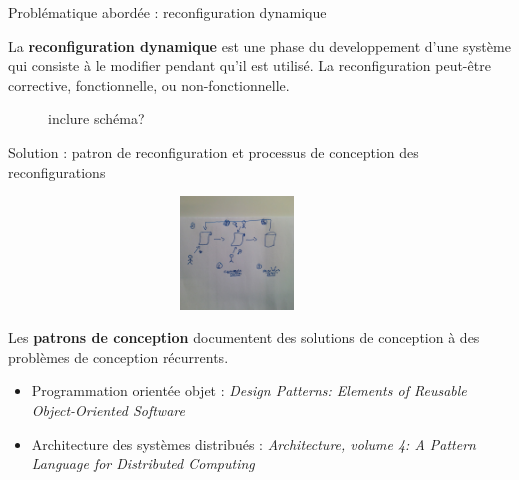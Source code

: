 

\begin{frame}{Problématique abordée : reconfiguration dynamique}
\begin{definition}
La \textbf{reconfiguration dynamique} est une phase du
developpement d'une système qui consiste à le modifier pendant qu’il est
utilisé. La reconfiguration peut-être corrective, fonctionnelle,  ou
non-fonctionnelle.
\end{definition}
\begin{figure}
inclure schéma? 
\end{figure}
\end{frame}

\begin{frame}{Solution : patron de reconfiguration et processus de
conception des reconfigurations}
\begin{figure}
\includegraphics[width=10cm, height=3cm]{imgs/slide_application_patron}
\end{figure}
\begin{definition}
Les \textbf{patrons de conception} documentent des solutions de
conception à des problèmes de conception récurrents.
\end{definition}
\begin{exampleblock}{}
\begin{itemize}
\item Programmation orientée objet : \textit{Design Patterns: Elements of
Reusable Object-Oriented Software} 
\item Architecture des systèmes distribués : \textit{Architecture,
volume 4: A Pattern Language for Distributed Computing}
\end{itemize}
\end{exampleblock}
\end{frame}


